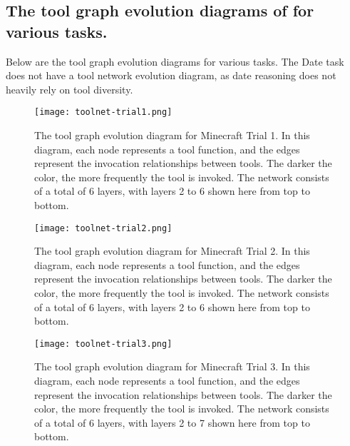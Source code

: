 \subsection{The tool graph evolution diagrams of {\ours} for various tasks.}
\label{subsec:tool-graph}
Below are the tool graph evolution diagrams for various tasks. The Date task does not have a tool network evolution diagram, as date reasoning does not heavily rely on tool diversity.


\begin{figure}[H]
\vskip 0.2in
\begin{center}
\centerline{\texttt{[image: toolnet-trial1.png]}}
\caption{
The tool graph evolution diagram for Minecraft Trial 1. In this diagram, each node represents a tool function, and the edges represent the invocation relationships between tools. The darker the color, the more frequently the tool is invoked. The network consists of a total of 6 layers, with layers 2 to 6 shown here from top to bottom.}
\label{fig:toolnet1}
\end{center}
\vskip -0.3in
\end{figure}

\vskip -0.2in
\begin{figure}[H]
\vskip 0.2in
\begin{center}
\centerline{\texttt{[image: toolnet-trial2.png]}}
\caption{The tool graph evolution diagram for Minecraft Trial 2. In this diagram, each node represents a tool function, and the edges represent the invocation relationships between tools. The darker the color, the more frequently the tool is invoked. The network consists of a total of 6 layers, with layers 2 to 6 shown here from top to bottom.}
\label{fig:toolnet2}
\end{center}
\vskip -0.3in
\end{figure}

\vskip -0.2in
\begin{figure}[H]
\vskip 0.2in
\begin{center}
\centerline{\texttt{[image: toolnet-trial3.png]}}
\caption{The tool graph evolution diagram for Minecraft Trial 3. In this diagram, each node represents a tool function, and the edges represent the invocation relationships between tools. The darker the color, the more frequently the tool is invoked. The network consists of a total of 6 layers, with layers 2 to 7 shown here from top to bottom.}
\label{fig:toolnet3}
\end{center}
\vskip -0.3in
\end{figure}


